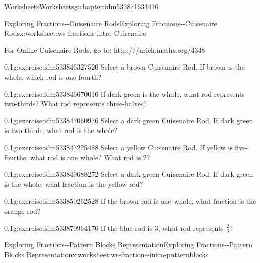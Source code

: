 \documentclass[twoside,11pt,]{book}
\begin{document}
\begin{chapterptx}{Worksheets}{}{Worksheets}{}{}{g:chapter:idm533871634416}
\begin{worksheet-section-numberless}{Exploring Fractions-{}-{}Cuisenaire Rods}{}{Exploring Fractions-{}-{}Cuisenaire Rods}{}{}{x:worksheet:ws-fractions-intro-Cuisenaire}
\begin{introduction}{}%
For Online Cuisenaire Rods, go to: http:\slash{}\slash{}\slash{}nrich.maths.org\slash{}4348%
\end{introduction}%
\begin{divisionexercise}{1}{}{0.1}{g:exercise:idm533846327520}%
Select a brown Cuisenaire Rod.  If brown is the whole, which rod is one-fourth?%
\end{divisionexercise}%
\begin{divisionexercise}{2}{}{0.1}{g:exercise:idm533846670016}%
If dark green is the whole, what rod represents two-thirds? What rod represents three-halves?%
\end{divisionexercise}%
\begin{divisionexercise}{3}{}{0.1}{g:exercise:idm533847060976}%
Select a dark green Cuisenaire Rod.  If dark green is two-thirds, what rod is the whole?%
\end{divisionexercise}%
\begin{divisionexercise}{4}{}{0.1}{g:exercise:idm533847225488}%
Select a yellow Cuisenaire Rod.  If yellow is five-fourths, what rod is one whole? What rod is 2?%
\end{divisionexercise}%
\begin{divisionexercise}{5}{}{0.1}{g:exercise:idm533849688272}%
Select a dark green Cuisenaire Rod.  If dark green is the whole, what fraction is the yellow rod?%
\end{divisionexercise}%
\begin{divisionexercise}{6}{}{0.1}{g:exercise:idm533850262528}%
If the brown rod is one whole, what fraction is the orange rod?%
\end{divisionexercise}%
\begin{divisionexercise}{7}{}{0.1}{g:exercise:idm533870964176}%
If the blue rod is 3, what rod represents \(\frac{2}{3} \)?%
\end{divisionexercise}%
\end{worksheet-section-numberless}
\restoregeometry
%
%
\typeout{************************************************}
\typeout{************************************************}
%
\begin{worksheet-section-numberless}{Exploring Fractions-{}-{}Pattern Blocks Representation}{}{Exploring Fractions-{}-{}Pattern Blocks Representation}{}{}{x:worksheet:ws-fractions-intro-patternblocks}
\begin{introduction}{}%

\end{introduction}
\end{worksheet-section-numberless}
\end{chapterptx}
\end{document}
